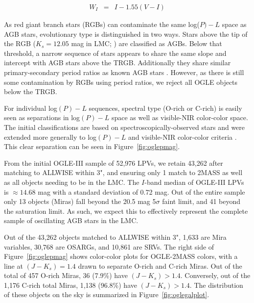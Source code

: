 \begin{eqnarray}
W_I &=& I - 1.55(V-I)
\end{eqnarray}

As red giant branch stars (RGBs) can contaminate the same log($P)-L$ space as AGB stars, evolutionary type is distinguished in two ways. Stars above the tip of the RGB ($K_s = 12.05$ mag in LMC; \citealt{2004AcA....54..129S, 2007AcA....57..201S}) are classified as AGBs. Below that threshold, a narrow sequence of stars appears to share the same slope and intercept with AGB stars above the TRGB. Additionally they share similar primary-secondary period ratios as known AGB stars \citep{2005AcA....55..331S}. However, as there is still some contamination by RGBs using period ratios, we reject all OGLE objects below the TRGB.

For individual log$(P)-L$ sequences, spectral type (O-rich or C-rich) is easily seen as separations in log$(P)-L$ space as well as visible-NIR color-color space. The initial classifications are based on spectroscopically-observed stars and were extended more generally to log$(P)-L$ and visible-NIR color-color criteria \citep{2005AcA....55..331S, 2007AcA....57..201S}. This clear separation can be seen in Figure~\ref{fig:oglepmag}.

From the initial OGLE-III sample of 52,976 LPVs, we retain 43,262 after matching to ALLWISE within 3", and ensuring only 1 match to 2MASS as well as all objects needing to be in the LMC. The $I$-band median of OGLE-III LPVs is $\approx14.68$ mag with a standard deviation of 0.72 mag. Out of the entire sample only 13 objects (Miras) fall beyond the 20.5 mag 5$\sigma$ faint limit, and 41 beyond the saturation limit. As such, we expect this to effectively represent the complete sample of oscillating AGB stars in the LMC.

Out of the 43,262 objects matched to ALLWISE within 3", 1,633 are Mira variables, 30,768 are OSARGs, and 10,861 are SRVs. The right side of Figure~\ref{fig:oglepmag} shows color-color plots for OGLE-2MASS colors, with a line at $(J-K_s) = 1.4$ drawn to separate O-rich and C-rich Miras. Out of the total of 457 O-rich Miras, 36 (7.9\%) have $(J-K_s) > 1.4$. Conversely, out of the 1,176 C-rich total Miras, 1,138 (96.8\%) have $(J-K_s) > 1.4$. The distribution of these objects on the sky is summarized in Figure~\ref{fig:oglegalplot}.

